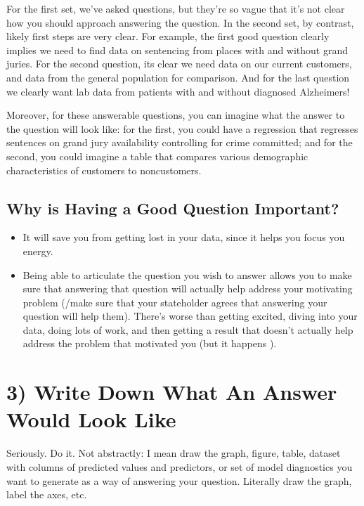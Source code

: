 \documentclass[letterpaper,10pt,english]{jupyterBook}
\begin{document}
\sphinxAtStartPar
For the first set, we’ve asked questions, but they’re so vague that it’s not clear how you should approach answering the question. In the second set, by contrast, likely first steps are very clear. For example, the first good question clearly implies we need to find data on sentencing from places with and without grand juries. For the second question, its clear we need data on our current customers, and data from the general population for comparison. And for the last question we clearly want lab data from patients with and without diagnosed Alzheimers!

\sphinxAtStartPar
Moreover, for these answerable questions, you can imagine what the answer to the question will look like: for the first, you could have a regression that regresses sentences on grand jury availability controlling for crime committed; and for the second, you could imagine a table that compares various demographic characteristics of customers to non\sphinxhyphen{}customers.


\subsection{Why is Having a Good Question Important?}
\label{\detokenize{40_in_practice/05_backwards_design:why-is-having-a-good-question-important}}\begin{itemize}
\item {} 
\sphinxAtStartPar
It will save you from getting lost in your data, since it helps you focus you energy.

\item {} 
\sphinxAtStartPar
Being able to articulate the question you wish to answer allows you to make sure that answering that question will actually help address your motivating problem (/make sure that your stateholder agrees that answering your question will help them). There’s  worse than getting excited, diving into your data, doing lots of work, and then getting a result that doesn’t actually help address the problem that motivated you (but it happens ).

\end{itemize}


\section{3) Write Down What An Answer Would Look Like}
\label{\detokenize{40_in_practice/05_backwards_design:write-down-what-an-answer-would-look-like}}
\sphinxAtStartPar
Seriously. Do it. Not abstractly: I mean draw the graph, figure, table, dataset with columns of predicted values and predictors, or set of model diagnostics you want to generate as a way of answering your question. Literally draw the graph, label the axes, etc.
\end{document}

